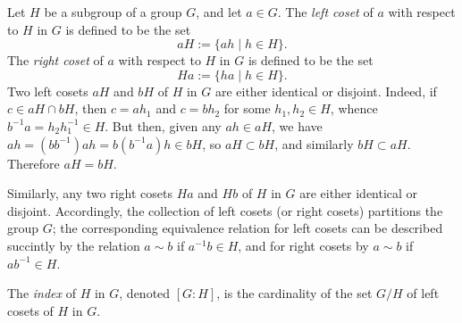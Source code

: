 \documentclass[12pt]{article}
\begin{document}
Let $H$ be a subgroup of a group $G$, and let $a \in G$. The {\em left coset} of $a$ with respect to $H$ in $G$ is defined to be the set
$$
aH := \{ ah \mid h \in H \}.
$$
The {\em right coset} of $a$ with respect to $H$ in $G$ is defined to be the set
$$
Ha := \{ ha \mid h \in H \}.
$$
Two left cosets $aH$ and $bH$ of $H$ in $G$ are either identical or disjoint. Indeed, if $c \in aH \cap bH$, then $c = ah_1$ and $c = bh_2$ for some $h_1,h_2 \in H$, whence $b^{-1} a = h_2 h_1^{-1} \in H$. But then, given any $ah \in aH$, we have $ah = (bb^{-1})ah = b(b^{-1}a) h \in bH$, so $aH \subset bH$, and similarly $bH \subset aH$. Therefore $aH = bH$.

Similarly, any two right cosets $Ha$ and $Hb$ of $H$ in $G$ are either identical or disjoint. Accordingly, the collection of left cosets (or right cosets) partitions the group $G$; the corresponding equivalence relation for left cosets can be described succintly by the relation $a \sim b$ if $a^{-1} b \in H$, and for right cosets by $a \sim b$ if $ab^{-1} \in H$.

The {\em index} of $H$ in $G$, denoted $[G:H]$, is the cardinality of the set $G/H$ of left cosets of $H$ in $G$.
\end{document}
